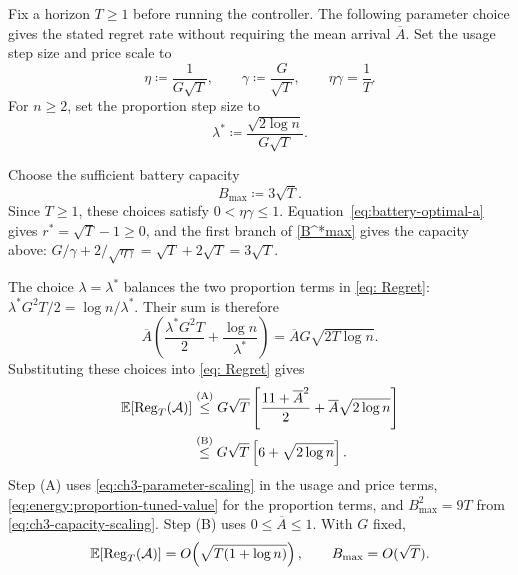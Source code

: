 Fix a horizon $T\geq1$ before running the controller. The following
parameter choice gives the stated regret rate without requiring the mean
arrival $\overline A$. Set the usage step size and price scale to
\begin{equation}
\label{eq:ch3-parameter-scaling}
  \eta\coloneqq\frac{1}{G\sqrt T},\qquad
  \gamma\coloneqq\frac{G}{\sqrt T},\qquad
  \eta\gamma=\frac{1}{T}.
\end{equation}
For $n\geq2$, set the proportion step size to
\begin{equation}
\label{eq:lambda-opt}
  \lambda^*\coloneqq\frac{\sqrt{2\log n}}{G\sqrt T}.
\end{equation}

Choose the sufficient battery capacity
\begin{equation}
\label{eq:ch3-capacity-scaling}
  B_{\mathrm{max}}\coloneqq3\sqrt T.
\end{equation}
Since $T\geq1$, these choices satisfy $0<\eta\gamma\leq1$.
Equation~\eqref{eq:battery-optimal-a} gives $r^*=\sqrt T-1\geq0$,
and the first branch of \eqref{B^*max} gives the capacity above:
$G/\gamma+2/\sqrt{\eta\gamma}=\sqrt T+2\sqrt T=3\sqrt T$.

The choice $\lambda=\lambda^*$ balances the two proportion terms in
\eqref{eq: Regret}: $\lambda^*G^2T/2=\log n/\lambda^*$.
Their sum is therefore
\begin{equation}\label{eq:energy:proportion-tuned-value}
  \overline A\left(\frac{\lambda^*G^2T}{2}+\frac{\log n}{\lambda^*}\right)
  =\overline A G\sqrt{2T\log n}.
\end{equation}
Substituting these choices into \eqref{eq: Regret} gives
\begin{equation}
\label{eq:ch3-explicit-sqrt-bound}
\begin{aligned}
 \mathbb{E}[\mathrm{Reg}_T(\mathcal A)]
 &\overset{\mathrm{(A)}}{\leq}G\sqrt T\left[
   \frac{11+\overline A^2}{2}+\overline A\sqrt{2\log n}\right]\\
 &\overset{\mathrm{(B)}}{\leq}G\sqrt T\left[6+\sqrt{2\log n}\right].
\end{aligned}
\end{equation}
Step (A) uses \eqref{eq:ch3-parameter-scaling} in the usage and price
terms, \eqref{eq:energy:proportion-tuned-value} for the proportion terms,
and $B_{\mathrm{max}}^2=9T$ from \eqref{eq:ch3-capacity-scaling}.
Step (B) uses $0\leq\overline A\leq1$. With $G$ fixed,
\[
  \mathbb{E}[\mathrm{Reg}_T(\mathcal A)]=O\!\left(\sqrt{T(1+\log n)}\right),\qquad
 B_{\mathrm{max}}=O(\sqrt T).
\]

